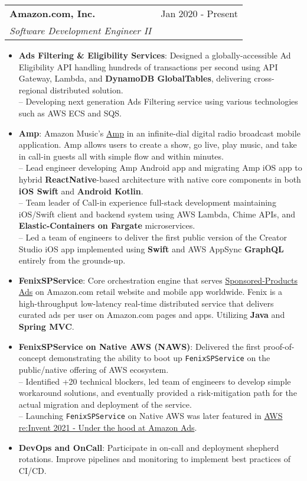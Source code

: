 \documentclass[letterpaper,11pt]{article}
\makeatletter
\newcommand{\resumeItem}[2]{
  \item\small{
    \textbf{#1}{: #2 \vspace{-2pt}}
  }
}
\newcommand{\resumeSubheading}[4]{
  \vspace{-1pt}\item
    \begin{tabular*}{0.97\textwidth}[t]{l@{\extracolsep{\fill}}r}
      \textbf{#1} & #2 \\
      \textit{\small #3} & \textit{\small #4} \\
    \end{tabular*}\vspace{-5pt}
}
\newcommand{\resumeItemListStart}{\begin{itemize}}
\newcommand{\resumeItemListEnd}{\end{itemize}\vspace{-5pt}}
\makeatother
\begin{document}
    \resumeSubheading
      {Amazon.com, Inc.}{Jan 2020 - Present}
      {Software Development Engineer II}{}
      \resumeItemListStart
		\resumeItem{Ads Filtering \& Eligibility Services}
          {Designed a globally-accessible Ad Eligibility API handling hundreds of transactions per second using API Gateway, Lambda, and \textbf{DynamoDB GlobalTables}, delivering cross-regional distributed solution. \\
          -- Developing next generation Ads Filtering service using various technologies such as AWS ECS and SQS.}
		\resumeItem{Amp}
          {Amazon Music's \href{https://techcrunch.com/2022/03/08/amazon-launches-a-live-radio-app-amp-which-lets-you-play-dj-with-the-amazon-music-catalog/}{Amp} in an infinite-dial digital radio broadcast mobile application. Amp allows users to create a show, go live, play music, and take in call-in guests all with simple flow and within minutes.\\
          -- Lead engineer developing Amp Android app and migrating Amp iOS app to hybrid \textbf{ReactNative}-based architecture with native core components in both \textbf{iOS Swift} and \textbf{Android Kotlin}.\\
          -- Team leader of Call-in experience full-stack development maintaining iOS/Swift client and backend system using AWS Lambda, Chime APIs, and \textbf{Elastic-Containers on Fargate} microservices.\\
          -- Led a team of engineers to deliver the first public version of the Creator Studio iOS app implemented using \textbf{Swift} and AWS AppSync \textbf{GraphQL} entirely from the grounds-up.}          
		\resumeItem{FenixSPService}
          {Core orchestration engine that serves \href{https://advertising.amazon.com/solutions/products/sponsored-products}{Sponsored-Products Ads} on Amazon.com retail website and mobile app worldwide. Fenix is a high-throughput low-latency real-time distributed service that delivers curated ads per user on Amazon.com pages and apps. Utilizing \textbf{Java} and \textbf{Spring MVC}.}
        \resumeItem{FenixSPService on Native AWS (NAWS)}
          {Delivered the first proof-of-concept demonstrating the ability to boot up \texttt{FenixSPService} on the public/native offering of AWS ecosystem.\\
          -- Identified +20 technical blockers, led team of engineers to develop simple workaround solutions, and eventually provided a risk-mitigation path for the actual migration and deployment of the service.\\
          -- Launching \texttt{FenixSPService} on Native AWS was later featured in \href{https://youtu.be/BS4MPpEO66I?t=1067}{AWS re:Invent 2021 - Under the hood at Amazon Ads}.}
        \resumeItem{DevOps and OnCall}
          {Participate in on-call and deployment shepherd rotations. Improve pipelines and monitoring to implement best practices of CI/CD.}
	\resumeItemListEnd
\end{document}
